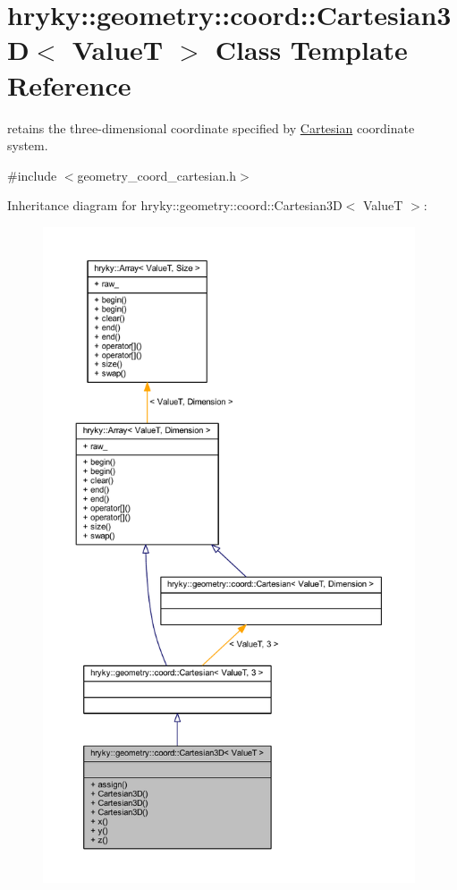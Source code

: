 \hypertarget{classhryky_1_1geometry_1_1coord_1_1_cartesian3_d}{\section{hryky\-:\-:geometry\-:\-:coord\-:\-:Cartesian3\-D$<$ Value\-T $>$ Class Template Reference}
\label{classhryky_1_1geometry_1_1coord_1_1_cartesian3_d}
}


retains the three-\/dimensional coordinate specified by \hyperlink{classhryky_1_1geometry_1_1coord_1_1_cartesian}{Cartesian} coordinate system.  




{\ttfamily \#include $<$geometry\-\_\-coord\-\_\-cartesian.\-h$>$}



Inheritance diagram for hryky\-:\-:geometry\-:\-:coord\-:\-:Cartesian3\-D$<$ Value\-T $>$\-:
\nopagebreak
\begin{figure}[H]
\begin{center}
\leavevmode
\includegraphics[height=550pt]{classhryky_1_1geometry_1_1coord_1_1_cartesian3_d__inherit__graph}
\end{center}
\end{figure}
